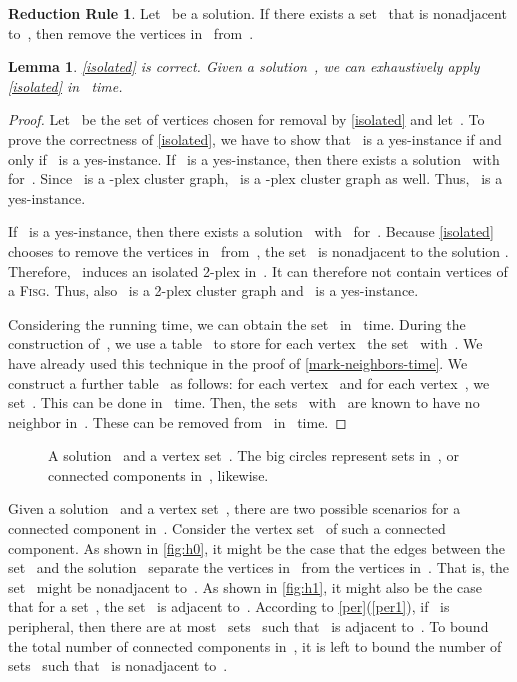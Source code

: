 \documentclass[12pt, a4paper, abstracton]{scrreprt}
\newcommand{\pl}[1]{\mbox{-plex}}
\newcommand{\pcg}[1]{\pl #1 cluster graph}
\newcommand{\FISG}{\textsc{Fisg}}
\newcounter{theorem}
\newtheorem{lemma}{Lemma}[chapter]
\theoremstyle{definition}
\newtheorem{rul}{Reduction Rule}[chapter]
\theoremstyle{remark}
\begin{document}
\begin{rul}\label{isolated}
  Let~ be a solution. If there exists a set~ that is nonadjacent to~, then remove the vertices in~ from~.
\end{rul}

\begin{lemma}\label{isolated-time}
  \autoref{isolated} is correct. Given a solution~, we can exhaustively apply \autoref{isolated} in ~time.
\end{lemma}

\begin{proof}
  Let~ be the set of vertices chosen for removal by \autoref{isolated} and let~. To prove the correctness of \autoref{isolated}, we have to show that ~is a yes-instance if and only if ~is a yes-instance. If ~is a yes-instance, then there exists a solution~ with~ for~. Since ~is a \pcg 2, ~is a \pcg 2 as well. Thus, ~is a yes-instance.

  If ~is a yes-instance, then there exists a solution~ with~ for~. Because \autoref{isolated} chooses to remove the vertices in~ from~, the set~ is nonadjacent to the solution . Therefore, ~induces an isolated 2-plex in~. It can therefore not contain vertices of a \FISG{}. Thus, also ~is a 2-plex cluster graph and ~is a yes-instance.

  Considering the running time, we can obtain the set~ in ~time. During the construction of~, we use a table~ to store for each vertex~ the set~ with~. We have already used this technique in the proof of \autoref{mark-neighbors-time}. We construct a further table~ as follows: for each vertex~ and for each vertex~, we set~. This can be done in~ time. Then, the sets~ with~ are known to have no neighbor in~. These can be removed from~ in~ time.
\end{proof}

\begin{figure}
  \centering

  \hspace{1cm}
  \caption{A solution~ and a vertex set~. The big circles represent sets in~, or connected components in~, likewise.}
  \label{teilung-h1h0}
\end{figure}
\noindent 
Given a solution~ and a vertex set~, there are two possible scenarios for a connected component in~. Consider the vertex set~ of such a connected component. As shown in \autoref{fig:h0}, it might be the case that the edges between the set~ and the solution~ separate the vertices in~ from the vertices in~. That is, the set~ might be nonadjacent to~. As shown in \autoref{fig:h1}, it might also be the case that for a set~, the set~ is adjacent to~. According to \autoref{per}(\ref{per1}), if~ is peripheral, then there are at most~ sets~ such that~ is adjacent to~. To bound the total number of connected components in~, it is left to bound the number of sets~ such that~ is nonadjacent to~.
\end{document}
